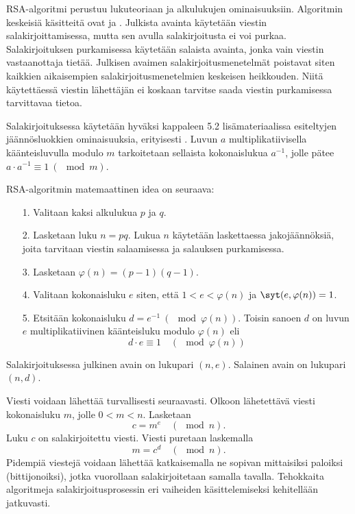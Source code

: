 RSA-algoritmi perustuu lukuteoriaan ja alkulukujen ominaisuuksiin. Algoritmin keskeisiä käsitteitä ovat  ja . Julkista avainta käytetään viestin salakirjoittamisessa, mutta sen avulla salakirjoitusta ei voi purkaa. Salakirjoituksen purkamisessa käytetään salaista avainta, jonka vain viestin vastaanottaja tietää. Julkisen avaimen salakirjoitusmenetelmät poistavat siten kaikkien aikaisempien salakirjoitusmenetelmien keskeisen heikkouden. Niitä käytettäessä viestin lähettäjän ei koskaan tarvitse saada viestin purkamisessa tarvittavaa tietoa. 

Salakirjoituksessa käytetään hyväksi kappaleen 5.2 lisämateriaalissa esiteltyjen jään\-nös\-luok\-kien ominaisuuksia, erityisesti . Luvun $a$ multiplikatiivisella käänteisluvulla modulo $m$ tarkoitetaan sellaista kokonaislukua $a^{-1}$, jolle pätee $a\cdot a^{-1} \equiv 1 \ (\mod m)$.

RSA-algoritmin matemaattinen idea on seuraava:
\begin{itemize}
\item[1.] Valitaan kaksi alkulukua $p$ ja $q$.
\item[2.] Lasketaan luku $n=pq$. Lukua $n$ käytetään laskettaessa jakojäännöksiä, joita tarvitaan viestin salaamisessa ja salauksen purkamisessa.
\item[3.] Lasketaan $\varphi(n)=(p-1)(q-1)$. 
\item[4.] Valitaan kokonaisluku $e$ siten, että $1<e<\varphi(n)$ ja $\syt(e,\varphi(n))=1$.
\item[5.] Etsitään kokonaisluku $d = e^{-1}\ (\mod \varphi(n))$. Toisin sanoen $d$ on luvun $e$  multiplikatiivinen käänteisluku modulo $\varphi(n)$ eli
\[
d\cdot e \equiv 1\quad (\mod\varphi(n)) %
\]
\end{itemize}
Salakirjoituksessa julkinen avain on lukupari $(n,e)$. Salainen avain on lukupari $(n,d)$. 

Viesti voidaan lähettää turvallisesti seuraavasti. Olkoon lähetettävä viesti kokonaisluku $m$, jolle $0<m<n$. Lasketaan
\[
c= m^e\quad (\mod n).
\]
Luku $c$ on salakirjoitettu viesti. Viesti puretaan laskemalla
\[
m=c^d\quad (\mod n).
\]
Pidempiä viestejä voidaan lähettää katkaisemalla ne sopivan mittaisiksi paloiksi (bittijonoiksi), jotka vuorollaan salakirjoitetaan samalla tavalla. Tehokkaita algoritmeja salakirjoitusprosessin eri vaiheiden käsittelemiseksi kehitellään jatkuvasti.

